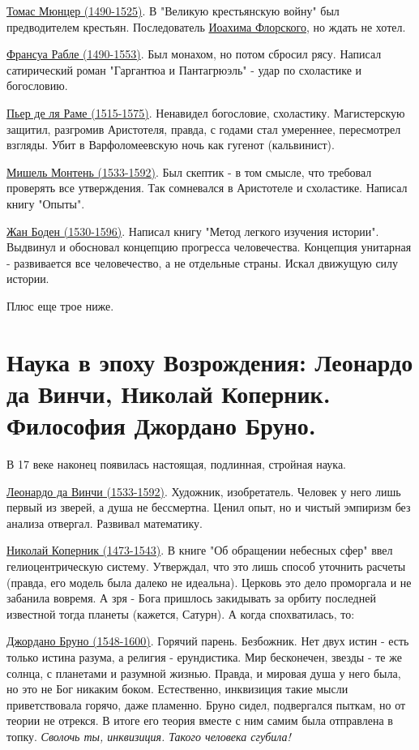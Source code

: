 \underline{Томас Мюнцер (1490-1525)}. В "Великую крестьянскую войну" был предводителем крестьян. Последователь \underline{Иоахима Флорского}, но ждать не хотел.

\underline{Франсуа Рабле (1490-1553)}. Был монахом, но потом сбросил рясу. Написал сатирический роман "Гаргантюа и Пантагрюэль" - удар по схоластике и богословию.

\underline{Пьер де ля Раме (1515-1575)}. Ненавидел богословие, схоластику. Магистерскую защитил, разгромив Аристотеля, правда, с годами стал умереннее, пересмотрел взгляды. Убит в Варфоломеевскую ночь как гугенот (кальвинист).

\underline{Мишель Монтень (1533-1592)}. Был скептик - в том смысле, что требовал проверять все утверждения. Так сомневался в Аристотеле и схоластике. Написал книгу "Опыты".

\underline{Жан Боден (1530-1596)}. Написал книгу "Метод легкого изучения истории". Выдвинул и обосновал концепцию прогресса человечества. Концепция унитарная - развивается все человечество, а не отдельные страны. Искал движущую силу истории.

Плюс еще трое ниже.

\section{Наука в эпоху Возрождения: Леонардо да Винчи, Николай Коперник. Философия Джордано Бруно.}
В 17 веке наконец появилась настоящая, подлинная, стройная наука. 

\underline{Леонардо да Винчи (1533-1592)}. Художник, изобретатель. Человек у него лишь первый из зверей, а душа не бессмертна. Ценил опыт, но и чистый эмпиризм без анализа отвергал. Развивал математику.

\underline{Николай Коперник (1473-1543)}. В книге "Об обращении небесных сфер" ввел гелиоцентрическую систему. Утверждал, что это лишь способ уточнить расчеты (правда, его модель была далеко не идеальна). Церковь это дело проморгала и не забанила вовремя. А зря - Бога пришлось закидывать за орбиту последней известной тогда планеты (кажется, Сатурн). А когда спохватилась, то:

\underline{Джордано Бруно (1548-1600)}. Горячий парень. Безбожник. Нет двух истин - есть только истина разума, а религия - ерундистика. Мир бесконечен, звезды - те же солнца, с планетами и разумной жизнью. Правда, и мировая душа у него была, но это не Бог никаким боком. Естественно, инквизиция такие мысли приветствовала горячо, даже пламенно. Бруно сидел, подвергался пыткам, но от теории не отрекся. В итоге его теория вместе с ним самим была отправлена в топку. \textit{Сволочь ты, инквизиция. Такого человека сгубила!}

\newpage

\newpage



